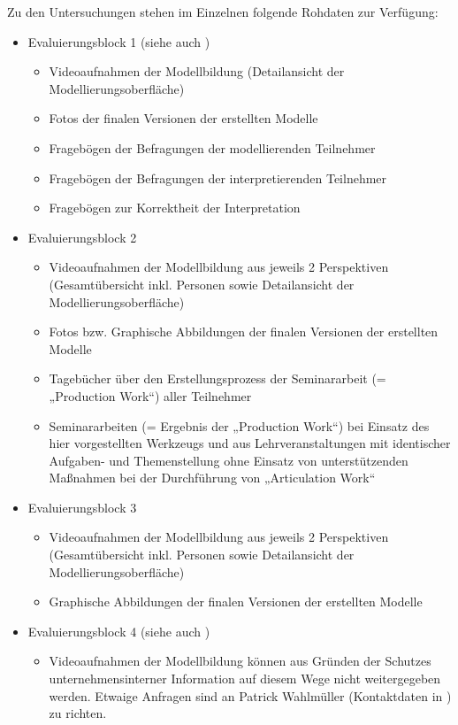 Zu den Untersuchungen stehen im Einzelnen folgende Rohdaten zur Verfügung:
\begin{itemize}
	\item Evaluierungsblock 1 (siehe auch \citep{Bohninger10})
		\begin{itemize}
			\item Videoaufnahmen der Modellbildung (Detailansicht der Modellierungsoberfläche)
			\item Fotos der finalen Versionen der erstellten Modelle
			\item Fragebögen der Befragungen der modellierenden Teilnehmer
			\item Fragebögen der Befragungen der interpretierenden Teilnehmer
			\item Fragebögen zur Korrektheit der Interpretation 
		\end{itemize}
	\item Evaluierungsblock 2
		\begin{itemize}
			\item Videoaufnahmen der Modellbildung aus jeweils 2 Perspektiven (Gesamtübersicht inkl. Personen sowie Detailansicht der Modellierungsoberfläche)
			\item Fotos bzw. Graphische Abbildungen der finalen Versionen der erstellten Modelle
			\item Tagebücher über den Erstellungsprozess der Seminararbeit (= „Production Work“) aller Teilnehmer
			\item Seminararbeiten (= Ergebnis der „Production Work“) bei Einsatz des hier vorgestellten Werkzeugs und aus Lehrveranstaltungen mit identischer Aufgaben- und Themenstellung ohne Einsatz von unterstützenden Maßnahmen bei der Durchführung von „Articulation Work“
		\end{itemize}
	\item Evaluierungsblock 3
		\begin{itemize}
			\item Videoaufnahmen der Modellbildung aus jeweils 2 Perspektiven (Gesamtübersicht inkl. Personen sowie Detailansicht der Modellierungsoberfläche)
			\item Graphische Abbildungen der finalen Versionen der erstellten Modelle
		\end{itemize}
	\item Evaluierungsblock 4 (siehe auch \citep{Wahlmuller10})
		\begin{itemize}
			\item Videoaufnahmen der Modellbildung können aus Gründen der Schutzes unternehmensinterner Information auf diesem Wege nicht weitergegeben werden. Etwaige Anfragen sind an Patrick Wahlmüller (Kontaktdaten in \citep{Wahlmuller10}) zu richten.

\end{itemize}
\end{itemize}
